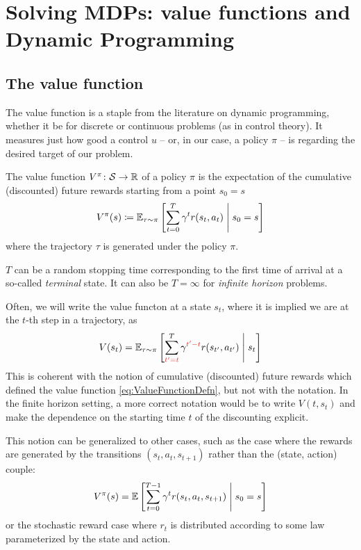 \documentclass[../course-notes.tex]{subfiles}
\begin{document}
\chapter{Solving MDPs: value functions and Dynamic Programming}\label{chap:DP}


\section{The value function}

The value function is a staple from the literature on dynamic programming, whether it be for discrete or continuous problems (as in control theory). It measures just how good a control $u$ -- or, in our case, a policy $\pi$ -- is regarding the desired target of our problem.


\begin{defn}
	The value function $V^\pi\colon \mathcal{S} \to \mathbb{R}$ of a policy $\pi$ is the expectation of the cumulative (discounted) future rewards starting from a point $s_0 = s$
	\begin{equation}\label{eq:ValueFunctionDefn}
	V^\pi(s) \coloneqq
	\operatorname{\mathbb{E}}_{\tau\sim\pi}\left[
	\sum_{t=0}^T \gamma^t r(s_t, a_t)
	\;\middle|\; s_0 = s
	\right]
	\end{equation}
	where the trajectory $\tau$ is generated under the policy $\pi$.
	
	$T$ can be a random stopping time corresponding to the first time of arrival at a so-called \emph{terminal} state. It can also be $T = \infty$ for \emph{infinite horizon} problems.
\end{defn}


\begin{remark}
	Often, we will write the value functon at a state $s_t$, where it is implied we are at the $t$-th step in a trajectory, as
	\[
	V(s_t) = \EE_{\tau\sim\pi}\left[
	\sum_{{\redfont t'=t}}^T \gamma^{{\redfont t'-t}} r(s_{t'}, a_{t'})
	\scalemid s_t
	\right]
	\]
	This is coherent with the notion of cumulative (discounted) future rewards which defined the value function \eqref{eq:ValueFunctionDefn}, but not with the notation. In the finite horizon setting, a more correct notation would be to write $V(t, s_t)$ and make the dependence on the starting time $t$ of the discounting explicit.
\end{remark}


This notion can be generalized to other cases, such as the case where the rewards are generated by the transitions $(s_t, a_t, s_{t+1})$ rather than the (state, action) couple:
\[
V^\pi(s) = \operatorname{\mathbb{E}}\left[
\sum_{t=0}^{T-1} \gamma^t r(s_t, a_t, s_{t+1})
\;\middle|\; s_0 = s
\right]
\]
or the stochastic reward case where $r_t$ is distributed according to some law parameterized by the state and action.
\end{document}
